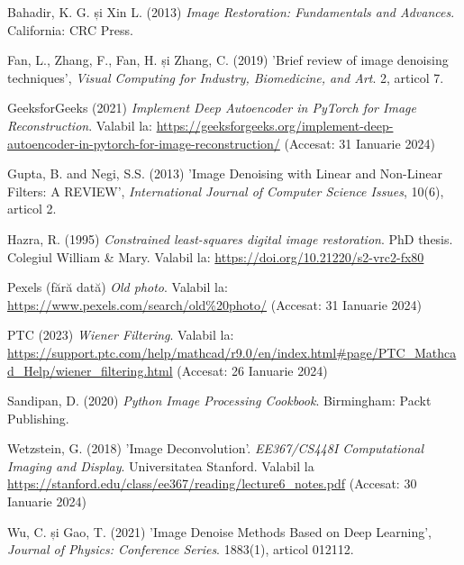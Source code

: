 \documentclass[12pt]{article}
\begin{document}

\begin{thebibliography}{9}

Bahadir, K. G. și Xin L. (2013) \emph{Image Restoration: Fundamentals and Advances}. California: CRC Press.

Fan, L., Zhang, F., Fan, H. și Zhang, C. (2019) 'Brief review of image denoising techniques', \emph{Visual Computing for Industry, Biomedicine, and Art}. 2, articol 7. 

GeeksforGeeks (2021) \emph{Implement Deep Autoencoder in PyTorch for Image Reconstruction}. Valabil la: \url{https://geeksforgeeks.org/implement-deep-autoencoder-in-pytorch-for-image-reconstruction/} (Accesat: 31 Ianuarie 2024)

Gupta, B. and Negi, S.S. (2013) 'Image Denoising with Linear and Non-Linear Filters: A REVIEW', \emph{International Journal of Computer Science Issues}, 10(6), articol 2. 

Hazra, R. (1995) \emph{Constrained least-squares digital image restoration}. PhD thesis. Colegiul William \& Mary. Valabil la: \url{https://doi.org/10.21220/s2-vrc2-fx80}

Pexels (fără dată) \emph{Old photo}. Valabil la: \url{https://www.pexels.com/search/old%20photo/} (Accesat: 31 Ianuarie 2024)

PTC (2023) \emph{Wiener Filtering}. Valabil la: \url{https://support.ptc.com/help/mathcad/r9.0/en/index.html#page/PTC_Mathcad_Help/wiener_filtering.html} (Accesat: 26 Ianuarie 2024)

Sandipan, D. (2020) \emph{Python Image Processing Cookbook}. Birmingham: Packt Publishing. 

Wetzstein, G. (2018) 'Image Deconvolution'. \emph{EE367/CS448I Computational Imaging and Display}. Universitatea Stanford. Valabil la \url{https://stanford.edu/class/ee367/reading/lecture6_notes.pdf} (Accesat: 30 Ianuarie 2024)

Wu, C. și Gao, T. (2021) 'Image Denoise Methods Based on Deep Learning', \emph{Journal of Physics: Conference Series}. 1883(1), articol 012112.

\end{thebibliography}
\end{document}
